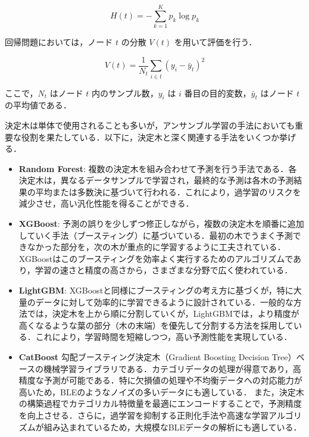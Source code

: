\begin{equation}
	H(t) = - \sum_{k=1}^{K} p_k \log p_k
\end{equation}

回帰問題においては，ノード $t$ の分散 $V(t)$ を用いて評価を行う．

\begin{equation}
	V(t) = \frac{1}{N_t} \sum_{i \in t} (y_i - \bar{y}_t)^2
\end{equation}

ここで，$N_t$ はノード $t$ 内のサンプル数，$y_i$ は $i$ 番目の目的変数，$\bar{y}_t$ はノード $t$ の平均値である．


決定木は単体で使用されることも多いが，アンサンブル学習の手法においても重要な役割を果たしている．以下に，決定木と深く関連する手法をいくつか挙げる．

\begin{itemize}
	\item \textbf{Random Forest}: 
	複数の決定木を組み合わせて予測を行う手法である\cite{randomforest}．各決定木は，異なるデータサンプルで学習され，最終的な予測は各木の予測結果の平均または多数決に基づいて行われる．これにより，過学習のリスクを減少させ，高い汎化性能を得ることができる．
	
	\item \textbf{XGBoost}:
	予測の誤りを少しずつ修正しながら，複数の決定木を順番に追加していく手法（ブースティング）に基づいている\cite{xgboost}．最初の木でうまく予測できなかった部分を，次の木が重点的に学習するように工夫されている．XGBoostはこのブースティングを効率よく実行するためのアルゴリズムであり，学習の速さと精度の高さから，さまざまな分野で広く使われている．
	
	\item \textbf{LightGBM}:
	XGBoostと同様にブースティングの考え方に基づくが，特に大量のデータに対して効率的に学習できるように設計されている\cite{lightgbm}．一般的な方法では，決定木を上から順に分割していくが，LightGBMでは，より精度が高くなるような葉の部分（木の末端）を優先して分割する方法を採用している．これにより，学習時間を短縮しつつ，高い予測性能を実現している．
	
	\item \textbf{CatBoost}
	勾配ブースティング決定木（Gradient Boosting Decision Tree）ベースの機械学習ライブラリである\cite{catboost}．カテゴリデータの処理が得意であり，高精度な予測が可能である．特に欠損値の処理や不均衡データへの対応能力が高いため，BLEのようなノイズの多いデータにも適している．
	また，決定木の構築過程でカテゴリカル特徴量を最適にエンコードすることで，予測精度を向上させる．さらに，過学習を抑制する正則化手法や高速な学習アルゴリズムが組み込まれているため，大規模なBLEデータの解析にも適している．
	
\end{itemize}

